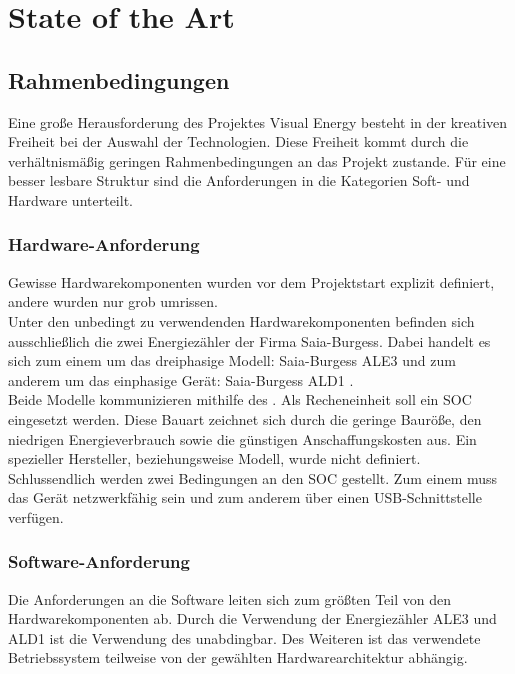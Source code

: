 \documentclass[../Bachelorarbeit.tex]{subfiles}
\begin{document}
\chapter{State of the Art}
\label{chap:state_of_the_art}

\section{Rahmenbedingungen}
Eine große Herausforderung des Projektes Visual Energy besteht in der kreativen Freiheit bei der Auswahl der Technologien. 
Diese Freiheit kommt durch die verhältnismäßig geringen Rahmenbedingungen an das Projekt zustande. 
Für eine besser lesbare Struktur sind die Anforderungen in die Kategorien Soft- und Hardware unterteilt.

\subsection{Hardware-Anforderung}
Gewisse Hardwarekomponenten wurden vor dem Projektstart explizit definiert, andere wurden nur grob umrissen.
\\
Unter den unbedingt zu verwendenden Hardwarekomponenten befinden sich ausschließlich die zwei Energiezähler der Firma Saia-Burgess.
Dabei handelt es sich zum einem um das dreiphasige Modell: Saia-Burgess \acs{ALE3} \parencite[vgl.][]{datenblatt_ale3} und zum anderem um das einphasige Gerät: Saia-Burgess \acs{ALD1} \parencite[vgl.][]{datenblatt_ald1}.  \\
Beide Modelle kommunizieren mithilfe des  . 
Als Recheneinheit soll ein \ac{SOC} eingesetzt werden. 
Diese Bauart zeichnet sich durch die geringe Bauröße, den niedrigen Energieverbrauch sowie die günstigen Anschaffungskosten aus. 
Ein spezieller Hersteller, beziehungsweise Modell, wurde nicht definiert. 
Schlussendlich werden zwei Bedingungen an den \ac{SOC} gestellt. 
Zum einem muss das Gerät netzwerkfähig sein und zum anderem über 
einen USB-Schnittstelle verfügen. 

\subsection{Software-Anforderung}
Die Anforderungen an die Software leiten sich zum größten Teil von den 
Hardwarekomponenten ab. Durch die Verwendung der Energiezähler \acs{ALE3} und \acs{ALD1} ist 
die Verwendung des  unabdingbar. Des Weiteren ist das verwendete 
Betriebssystem teilweise von der gewählten Hardwarearchitektur abhängig.
\end{document}
